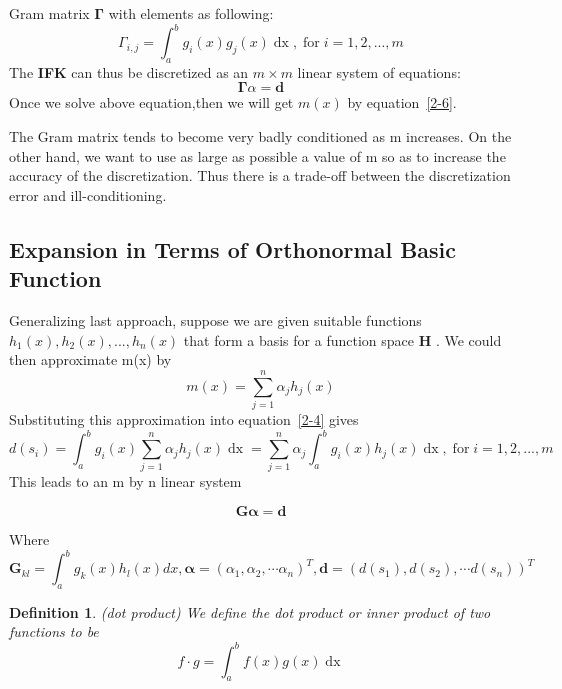 \documentclass[a4paper]{article}
\newtheorem{definition}[theorem]{Definition}
\newcommand{\tmem}[1]{{\em #1\/}}
\newcommand{\tmmathbf}[1]{\ensuremath{\boldsymbol{#1}}}
\newcommand{\tmname}[1]{\textsc{#1}}
\newcommand{\tmop}[1]{\ensuremath{\operatorname{#1}}}
\newcommand{\tmstrong}[1]{\textbf{#1}}
\begin{document}
Gram matrix {\tmem{$\tmmathbf{\Gamma}$}} with elements as following:
\begin{equation}
  \Gamma_{i, j} = \int_a^b g_i (x) g_j (x) \tmop{dx}, \tmop{for} i = 1, 2,
  ..., m
\end{equation}
The {\tmname{{\tmstrong{IFK}}}} can thus be discretized as an $m\times m$ linear system of equations:
\begin{equation}
  \tmmathbf{\Gamma} \alpha =\tmmathbf{d}
\end{equation}
Once we solve above equation,then we will get $m (x)$ by equation~\ref{2-6}.

The Gram matrix tends to become very badly conditioned as m
increases{\cite{7}}. On the other hand, we want to use as large as possible a
value of m so as to increase the accuracy of the discretization. Thus there is
a trade-off between the discretization error and ill-conditioning.


\subsection{Expansion in Terms of Orthonormal Basic Function}

Generalizing last approach, suppose we are given suitable functions $h_1 (x),
h_2 (x), ..., h_n (x)$ that form a basis for a function space {\tmstrong{H}} .
We could then approximate m(x) by
\begin{equation}
  m (x) = \sum^n_{j = 1} \alpha_j h_j \left( x \right)
\end{equation}
Substituting this approximation into equation~\ref{2-4} gives
\begin{equation}
  d (s_i) = \int_a^b g_i (x) \sum^n_{j = 1} \alpha_j h_j \left( x \right)
  \tmop{dx} = \sum^n_{j = 1} \alpha_j \int_a^b g_i (x) h_j \left( x \right)
  \tmop{dx}, \tmop{for} i = 1, 2, ..., m
\end{equation}
This leads to an m by n linear system


\begin{equation}
  \tmmathbf{G} \tmmathbf{\alpha} =\tmmathbf{d}
\end{equation}

Where
\[
{{\tmmathbf{G}}_{kl}}=\int_{a}^{b}{{{g}_{k}}(x){{h}_{l}}(x)dx},\tmmathbf{\alpha} ={{\left( {{\alpha }_{1}},{{\alpha }_{2}},\cdots {{\alpha }_{n}} \right)}^{T}},\tmmathbf{d}={{\left( d({{s}_{1}}),d({{s}_{2}}),\cdots d({{s}_{n}}) \right)}^{T}}
\]


\begin{definition}
  (dot product) We define the dot product or inner product of two functions to
  be
  \[ f \cdot g = \int_a^b f (x) g (x) \tmop{dx} \]
\end{definition}
\end{document}
